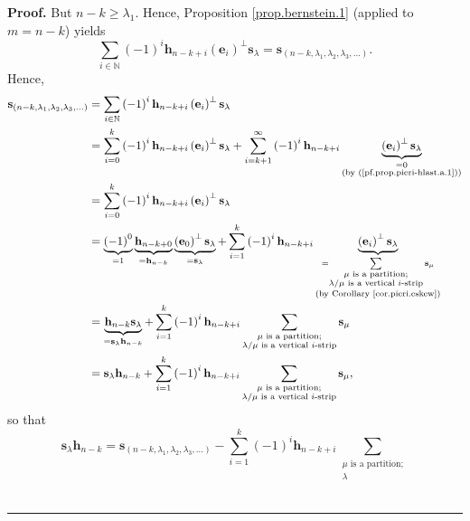 \documentclass[numbers=enddot,12pt,final,onecolumn,notitlepage]{scrartcl}%
\theoremstyle{definition}
\newenvironment{proof}[1][Proof]{\noindent\textbf{#1.} }{\ \rule{0.5em}{0.5em}}
\let\sumnonlimits\sum
\renewcommand{\sum}{\sumnonlimits\limits}
\begin{document}
\begin{proof}
But $n-k\geq\lambda_{1}$. Hence, Proposition \ref{prop.bernstein.1} (applied
to $m=n-k$) yields%
\[
\sum_{i\in\mathbb{N}}\left(  -1\right)  ^{i}\mathbf{h}_{n-k+i}\left(
\mathbf{e}_{i}\right)  ^{\perp}\mathbf{s}_{\lambda}=\mathbf{s}_{\left(
n-k,\lambda_{1},\lambda_{2},\lambda_{3},\ldots\right)  }.
\]
Hence,%
\begin{align*}
\mathbf{s}_{\left(  n-k,\lambda_{1},\lambda_{2},\lambda_{3},\ldots\right)  }
&  =\sum_{i\in\mathbb{N}}\left(  -1\right)  ^{i}\mathbf{h}_{n-k+i}\left(
\mathbf{e}_{i}\right)  ^{\perp}\mathbf{s}_{\lambda}\\
&  =\sum_{i=0}^{k}\left(  -1\right)  ^{i}\mathbf{h}_{n-k+i}\left(
\mathbf{e}_{i}\right)  ^{\perp}\mathbf{s}_{\lambda}+\sum_{i=k+1}^{\infty
}\left(  -1\right)  ^{i}\mathbf{h}_{n-k+i}\underbrace{\left(  \mathbf{e}%
_{i}\right)  ^{\perp}\mathbf{s}_{\lambda}}_{\substack{=0\\\text{(by
(\ref{pf.prop.pieri-hlast.a.1}))}}}\\
&  =\sum_{i=0}^{k}\left(  -1\right)  ^{i}\mathbf{h}_{n-k+i}\left(
\mathbf{e}_{i}\right)  ^{\perp}\mathbf{s}_{\lambda}\\
&  =\underbrace{\left(  -1\right)  ^{0}}_{=1}\underbrace{\mathbf{h}_{n-k+0}%
}_{=\mathbf{h}_{n-k}}\underbrace{\left(  \mathbf{e}_{0}\right)  ^{\perp
}\mathbf{s}_{\lambda}}_{=\mathbf{s}_{\lambda}}+\sum_{i=1}^{k}\left(
-1\right)  ^{i}\mathbf{h}_{n-k+i}\underbrace{\left(  \mathbf{e}_{i}\right)
^{\perp}\mathbf{s}_{\lambda}}_{\substack{=\sum_{\substack{\mu\text{ is a
partition;}\\\lambda/\mu\text{ is a vertical }i\text{-strip}}}\mathbf{s}_{\mu
}\\\text{(by Corollary \ref{cor.pieri.eskew})}}}\\
&  =\underbrace{\mathbf{h}_{n-k}\mathbf{s}_{\lambda}}_{=\mathbf{s}_{\lambda
}\mathbf{h}_{n-k}}+\sum_{i=1}^{k}\left(  -1\right)  ^{i}\mathbf{h}_{n-k+i}%
\sum_{\substack{\mu\text{ is a partition;}\\\lambda/\mu\text{ is a vertical
}i\text{-strip}}}\mathbf{s}_{\mu}\\
&  =\mathbf{s}_{\lambda}\mathbf{h}_{n-k}+\sum_{i=1}^{k}\left(  -1\right)
^{i}\mathbf{h}_{n-k+i}\sum_{\substack{\mu\text{ is a partition;}\\\lambda
/\mu\text{ is a vertical }i\text{-strip}}}\mathbf{s}_{\mu},
\end{align*}
so that%
\[
\mathbf{s}_{\lambda}\mathbf{h}_{n-k}=\mathbf{s}_{\left(  n-k,\lambda
_{1},\lambda_{2},\lambda_{3},\ldots\right)  }-\sum_{i=1}^{k}\left(  -1\right)
^{i}\mathbf{h}_{n-k+i}\sum_{\substack{\mu\text{ is a partition;}\\\lambda
}}\]
\end{proof}
\end{document}
